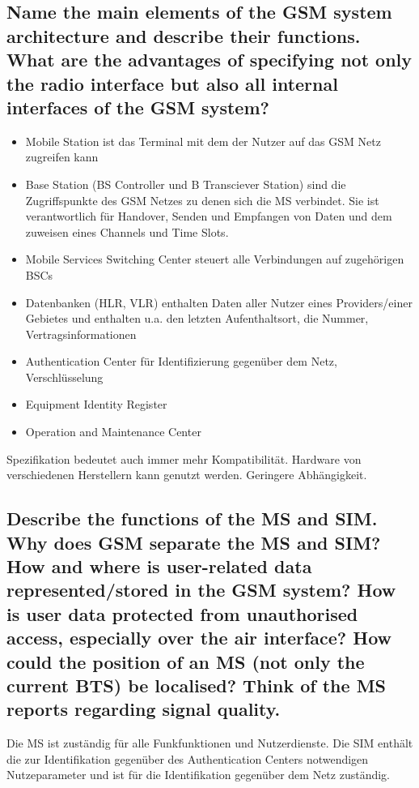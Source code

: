 \subsection{Name the main elements of the GSM system architecture and describe their
functions. What are the advantages of specifying not only the radio interface but also
all internal interfaces of the GSM system?}
\begin{itemize}
\item Mobile Station ist das Terminal mit dem der Nutzer auf das GSM Netz zugreifen kann

\item Base Station (BS Controller und B Transciever Station) sind die Zugriffspunkte des GSM Netzes zu denen sich die MS verbindet. Sie ist verantwortlich für Handover, Senden und Empfangen von Daten und dem zuweisen eines Channels und Time Slots.

\item Mobile Services Switching Center steuert alle Verbindungen auf zugehörigen BSCs

\item Datenbanken (HLR, VLR) enthalten Daten aller Nutzer eines Providers/einer Gebietes und enthalten u.a. den letzten Aufenthaltsort, die Nummer, Vertragsinformationen

\item Authentication Center für Identifizierung gegenüber dem Netz, Verschlüsselung

\item Equipment Identity Register 

\item Operation and Maintenance Center 
\end{itemize}

Spezifikation bedeutet auch immer mehr Kompatibilität. Hardware von verschiedenen Herstellern kann genutzt werden. Geringere Abhängigkeit.


\subsection{Describe the functions of the MS and SIM. Why does GSM separate the MS and
SIM? How and where is user-related data represented/stored in the GSM system?
How is user data protected from unauthorised access, especially over the air
interface? How could the position of an MS (not only the current BTS) be localised?
Think of the MS reports regarding signal quality.}

Die MS ist zuständig für alle Funkfunktionen und Nutzerdienste.
Die SIM enthält die zur Identifikation gegenüber des Authentication Centers notwendigen Nutzeparameter und ist für die Identifikation gegenüber dem Netz zuständig.



